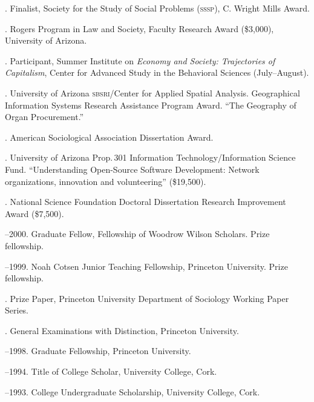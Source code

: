 \documentclass[11pt]{article}
\begin{document}
. Finalist, Society for the Study of Social Problems (\textsc{sssp}), C. Wright Mills Award.

. Rogers Program in Law and Society, Faculty Research Award
(\$3,000), University of Arizona.

. Participant, Summer Institute on \emph{Economy and Society: Trajectories of Capitalism}, Center for Advanced Study in the Behavioral Sciences (July--August).

. University of Arizona \textsc{sbsri}/Center for Applied Spatial
Analysis. Geographical Information Systems Research Assistance
Program Award. ``The Geography of Organ Procurement.''

. American Sociological Association Dissertation Award.

. University of Arizona Prop.\,301 Information Technology/Information Science Fund. ``Understanding Open-Source Software Development: Network organizations, innovation and volunteering'' (\$19,500).

. National Science Foundation Doctoral Dissertation Research Improvement Award (\$7,500).

--2000. Graduate Fellow, Fellowship of Woodrow Wilson Scholars. Prize fellowship.

--1999. Noah Cotsen Junior Teaching Fellowship, Princeton University. Prize fellowship.

. Prize Paper, Princeton University Department of Sociology Working Paper Series.

. General Examinations with Distinction, Princeton University.

--1998. Graduate Fellowship, Princeton University.

--1994. Title of College Scholar, University College, Cork.

--1993. College Undergraduate Scholarship, University
College, Cork.






\end{document}
